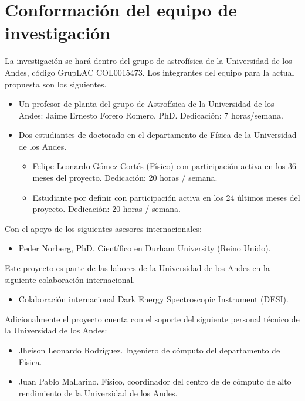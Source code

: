 \section{Conformaci\'on del equipo de investigaci\'on}

La investigaci\'on se har\'a dentro del grupo de astrof\'isica de la
Universidad de los Andes, c\'odigo GrupLAC COL0015473. 
Los integrantes del equipo para la actual propuesta son los
siguientes.  


\begin{itemize}
\item Un profesor de planta del grupo de Astrof\'isica de la
  Universidad de los Andes: Jaime Ernesto  Forero Romero, PhD.
  Dedicaci\'on: 7 horas/semana.
\item Dos estudiantes de doctorado en el departamento de F\'isica de
  la Universidad de los Andes.
\begin{itemize}
\item Felipe Leonardo G\'omez Cort\'es (F\'isico) con participaci\'on
  activa en los 36 meses del proyecto. Dedicaci\'on: 20 horas /
  semana.   
\item Estudiante por definir con participaci\'on activa en los 24 \'ultimos
  meses del proyecto. Dedicaci\'on: 20 horas / semana.  
\end{itemize}
\end{itemize}

\noindent

Con el apoyo de los siguientes asesores internacionales:

\begin{itemize}
\item Peder Norberg, PhD. Cient\'ifico en Durham University (Reino Unido).
\end{itemize}

Este proyecto es parte de las labores de la Universidad de los Andes
en la siguiente colaboraci\'on internacional.

\begin{itemize}
\item Colaboraci\'on internacional Dark Energy Spectroscopic Instrument
(DESI). 
\end{itemize}

\noindent
Adicionalmente el proyecto cuenta con el soporte del siguiente
personal t\'ecnico de la Universidad de los Andes:

\begin{itemize}
\item{Jheison Leonardo Rodr\'iguez. Ingeniero de c\'omputo del
  departamento de F\'isica.} 
\item{Juan Pablo Mallarino. F\'isico, coordinador del centro de de
  c\'omputo de alto rendimiento de la Universidad de los Andes.}
\end{itemize}
